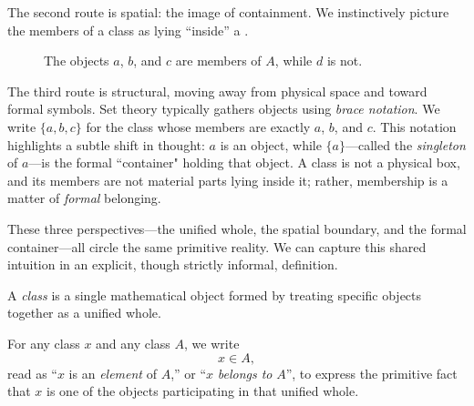 The second route is spatial: the image of containment. We instinctively picture the members of a class as lying ``inside'' a .

\begin{sideillustration}[containment]
\begin{figure}[h]
\centering
{}
\caption{The objects $a$, $b$, and $c$ are members of $A$, while $d$ is not.}
\end{figure}
\end{sideillustration}

The third route is structural, moving away from physical space and toward formal symbols. Set theory typically gathers objects using \textit{brace notation}. We write $\{a,b,c\}$ for the class whose members are exactly $a$, $b$, and $c$. This notation highlights a subtle shift in thought: $a$ is an object, while $\{a\}$---called the \textit{singleton} of $a$---is the formal ``container" holding that object. A class is not a physical box, and its members are not material parts lying inside it; rather, membership is a matter of \textit{formal} belonging.

These three perspectives---the unified whole, the spatial boundary, and the formal container---all circle the same primitive reality. We can capture this shared intuition in an explicit, though strictly informal, definition.

\begin{definitionzero}[Informal]
A \textit{class} is a single mathematical object formed by treating specific objects together as a unified whole.

For any class $x$ and any class $A$, we write
\[
x \in A,
\]
read as ``$x$ is an \textit{element} of $A$,'' or ``$x$ \textit{belongs to} $A$'',
to express the primitive fact that $x$ is one of the objects participating in that unified whole.
\end{definitionzero}
\bookvspace{0.85em}


